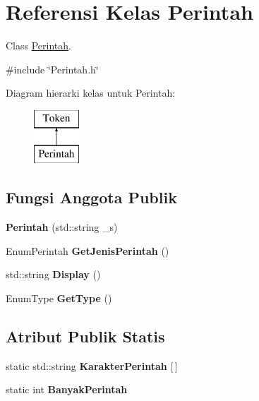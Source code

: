 \hypertarget{classPerintah}{}\section{Referensi Kelas Perintah}
\label{classPerintah}


Class \hyperlink{classPerintah}{Perintah}.  




{\ttfamily \#include \char`\"{}Perintah.\+h\char`\"{}}

Diagram hierarki kelas untuk Perintah\+:\begin{figure}[H]
\begin{center}
\leavevmode
\includegraphics[height=2.000000cm]{d9/de7/classPerintah}
\end{center}
\end{figure}
\subsection*{Fungsi Anggota Publik}
\begin{DoxyCompactItemize}
\item 
\hypertarget{classPerintah_a653750ef3a98a12a11b3bfb6285484c2}{}{\bfseries Perintah} (std\+::string \+\_\+s)\label{classPerintah_a653750ef3a98a12a11b3bfb6285484c2}

\item 
\hypertarget{classPerintah_aef16391fc67acc7ff74354db10eaa92a}{}Enum\+Perintah {\bfseries Get\+Jenis\+Perintah} ()\label{classPerintah_aef16391fc67acc7ff74354db10eaa92a}

\item 
\hypertarget{classPerintah_a32e0674e117dea6e1b69ea66ed885ea1}{}std\+::string {\bfseries Display} ()\label{classPerintah_a32e0674e117dea6e1b69ea66ed885ea1}

\item 
\hypertarget{classPerintah_ad2e51be1b5d590c538be4eeaecd9b110}{}Enum\+Type {\bfseries Get\+Type} ()\label{classPerintah_ad2e51be1b5d590c538be4eeaecd9b110}

\end{DoxyCompactItemize}
\subsection*{Atribut Publik Statis}
\begin{DoxyCompactItemize}
\item 
\hypertarget{classPerintah_ad52acf87f08dae5f2756e80597a925e5}{}static std\+::string {\bfseries Karakter\+Perintah} \mbox{[}$\,$\mbox{]}\label{classPerintah_ad52acf87f08dae5f2756e80597a925e5}

\item 
\hypertarget{classPerintah_afb3b32fca72ced1dd39c9083d65f721e}{}static int {\bfseries Banyak\+Perintah}\label{classPerintah_afb3b32fca72ced1dd39c9083d65f721e}

\end{DoxyCompactItemize}
